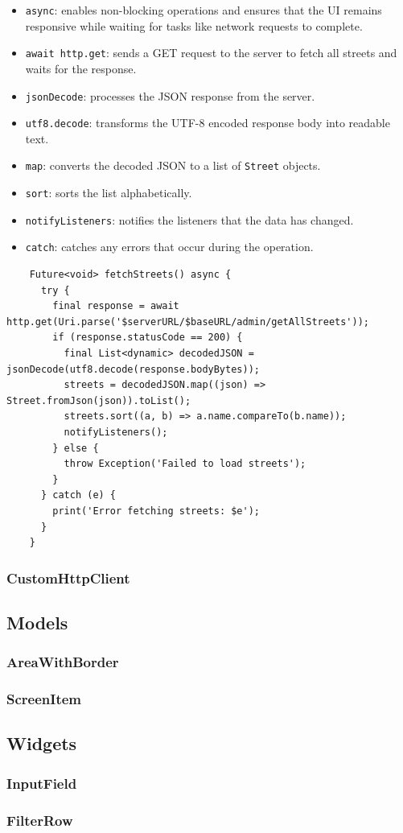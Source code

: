 \begin{itemize}
    \item \texttt{async}: enables non-blocking operations and ensures that the UI remains responsive while waiting for tasks like network requests to complete.
    \item \texttt{await http.get}: sends a GET request to the server to fetch all streets and waits for the response.
    \item \texttt{jsonDecode}: processes the JSON response from the server.
    \item \texttt{utf8.decode}: transforms the UTF-8 encoded response body into readable text.
    \item \texttt{map}: converts the decoded JSON to a list of \texttt{Street} objects.
    \item \texttt{sort}: sorts the list alphabetically.
    \item \texttt{notifyListeners}: notifies the listeners that the data has changed.
    \item \texttt{catch}: catches any errors that occur during the operation.
\end{itemize}
\lstset{style=mycsharp, caption=typical method in AdminAddressProvider}
\begin{lstlisting}
    Future<void> fetchStreets() async {
      try {
        final response = await http.get(Uri.parse('$serverURL/$baseURL/admin/getAllStreets'));
        if (response.statusCode == 200) {
          final List<dynamic> decodedJSON = jsonDecode(utf8.decode(response.bodyBytes));
          streets = decodedJSON.map((json) => Street.fromJson(json)).toList();
          streets.sort((a, b) => a.name.compareTo(b.name));
          notifyListeners();
        } else {
          throw Exception('Failed to load streets');
        }
      } catch (e) {
        print('Error fetching streets: $e');
      }
    }
\end{lstlisting}

\subsubsection{CustomHttpClient}

\subsection{Models}

\subsubsection{AreaWithBorder}

\subsubsection{ScreenItem}

\subsection{Widgets}

\subsubsection{InputField}
\label{fig:InputField} 


\subsubsection{FilterRow}
\label{fig:FilterRow}